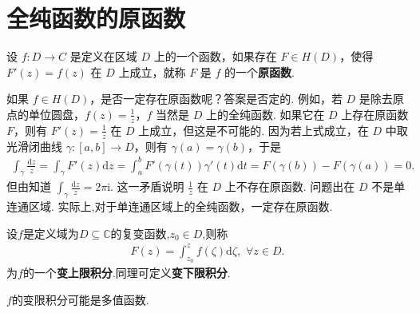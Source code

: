 \documentclass[../../main.tex]{subfiles}%
\begin{document}
\section{全纯函数的原函数}

\begin{definition}
设 \( f:D \to C \) 是定义在区域 \( D \) 上的一个函数，如果存在 \( F \in H(D) \)，使得 \( F'(z) = f(z) \) 在 \( D \) 上成立，就称 \( F \) 是 \( f \) 的一个\textbf{原函数}.
\end{definition}

如果 \( f \in H(D) \)，是否一定存在原函数呢？答案是否定的. 例如，若 \( D \) 是除去原点的单位圆盘，\( f(z) = \frac{1}{z} \)，\( f \) 当然是 \( D \) 上的全纯函数. 如果它在 \( D \) 上存在原函数 \( F \)，则有 \( F'(z) = \frac{1}{z} \) 在 \( D \) 上成立，但这是不可能的. 因为若上式成立，在 \( D \) 中取光滑闭曲线 \( \gamma: [a,b] \to D \)，则有 \( \gamma(a) = \gamma(b) \)，于是
\begin{align*}
\int_{\gamma} \frac{\mathrm{d}z }{z} = \int_{\gamma} F'(z) \mathrm{d}z  = \int_{a}^{b} F'(\gamma(t)) \gamma'(t) \mathrm{d}t = F(\gamma(b)) - F(\gamma(a)) = 0.
\end{align*}
但由知道 \( \int_{\gamma} \frac{\mathrm{d}z }{z} = 2\pi \mathrm{i} \). 这一矛盾说明 \( \frac{1}{z} \) 在 \( D \) 上不存在原函数. 问题出在 \( D \) 不是单连通区域. 实际上,对于单连通区域上的全纯函数，一定存在原函数.

\begin{definition}[变限积分]
设$f$是定义域为$D\subseteq \mathbb{C}$的复变函数,$z_0\in D$,则称
\begin{align*}
F(z) = \int_{z_0}^{z} f(\zeta) \mathrm{d}\zeta ,\,\, \forall z\in D.
\end{align*}
为$f$的一个\textbf{变上限积分}.同理可定义\textbf{变下限积分}.
\end{definition}
\begin{remark}
$f$的变限积分可能是多值函数.
\end{remark}
\end{document}
